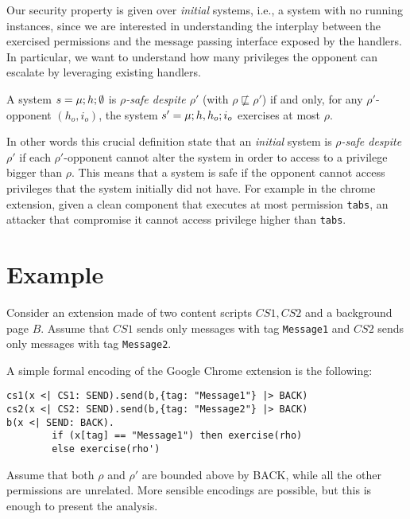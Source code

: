Our security property is given over \emph{initial} systems, i.e., a system with no running instances, since we are interested in understanding the interplay between the exercised permissions and the message passing interface exposed by the handlers. In particular, we want to understand how many privileges the opponent can escalate by leveraging existing handlers.

\begin{definition}
\label{def:safety}
A system $s = \mu;h;\emptyset$ is \emph{$\rho$-safe despite $\rho'$} (with $\rho \not\sqsubseteq \rho'$) if and only, for any $\rho'$-opponent $(h_o,i_o)$, the system $s' = \mu;h,h_o;i_o$ exercises at most $\rho$.
\end{definition}
In other words this crucial definition state that an \emph{initial} system is \emph{$\rho$-safe despite $\rho'$} if each $\rho'$-opponent cannot alter the system in order to access to a privilege bigger than $\rho$. This means that a system is safe if the opponent cannot access privileges that the system initially did not have. For example in the chrome extension, given a clean component that executes at most permission \texttt{tabs}, an attacker that compromise it cannot access privilege higher than \texttt{tabs}.

\section{Example}
\label{sec:Example}
Consider an extension made of two content scripts $CS1,CS2$ and a background page $B$. Assume that $CS1$ sends only messages with tag \texttt{Message1} and $CS2$ sends only messages with tag \texttt{Message2}.

A simple formal encoding of the Google Chrome extension is the following:
\begin{verbatim}
cs1(x <| CS1: SEND).send(b,{tag: "Message1"} |> BACK)
cs2(x <| CS2: SEND).send(b,{tag: "Message2"} |> BACK)
b(x <| SEND: BACK).
        if (x[tag] == "Message1") then exercise(rho) 
        else exercise(rho')
\end{verbatim}
Assume that both $\rho$ and $\rho'$ are bounded above by BACK, while all the other permissions are unrelated. More sensible encodings are possible, but this is enough to present the analysis.

